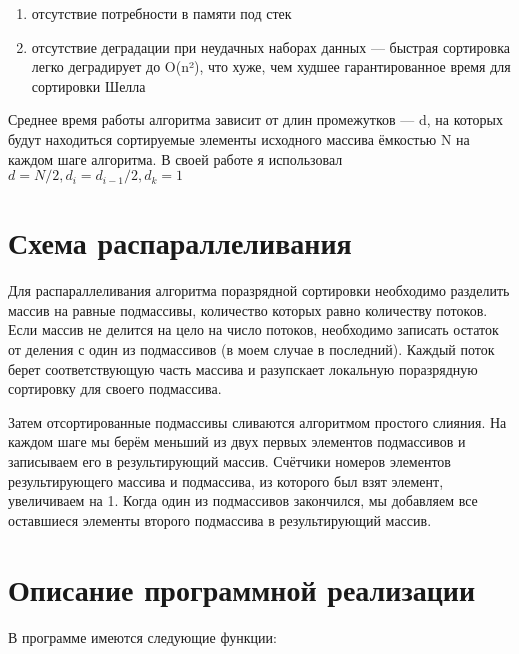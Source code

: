 \documentclass{report}
\begin{document}
\begin{enumerate}
	\item отсутствие потребности в памяти под стек
	\item отсутствие деградации при неудачных наборах данных — быстрая сортировка легко деградирует до O(n²), что хуже, чем худшее гарантированное время для сортировки Шелла
\end{enumerate}

\par
Среднее время работы алгоритма зависит от длин промежутков — d, на которых будут находиться сортируемые элементы исходного массива ёмкостью N на каждом шаге алгоритма. В своей работе я использовал   $d=N/2,d_{i}=d_{i-1}/2,d_{k}=1$
\newpage

\section*{Схема распараллеливания}
Для распараллеливания алгоритма поразрядной сортировки необходимо разделить массив на равные подмассивы, количество которых равно количеству потоков. Если массив не делится на цело на число потоков, необходимо записать остаток от деления с один из подмассивов (в моем случае в последний).
 Каждый поток берет соответствующую часть массива и разупскает локальную поразрядную сортировку для своего подмассива.
\par Затем отсортированные подмассивы сливаются алгоритмом простого слияния. На каждом шаге мы берём меньший из двух первых элементов подмассивов и записываем его в результирующий массив. Счётчики номеров элементов результирующего массива и подмассива, из которого был взят элемент, увеличиваем на 1. Когда один из подмассивов закончился, мы добавляем все оставшиеся элементы второго подмассива в результирующий массив.
\newpage

\section*{Описание программной реализации}
В программе имеются следующие функции:
\end{document}
